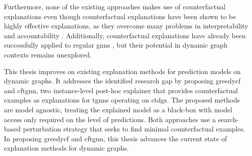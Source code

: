 Furthermore, none of the existing approaches makes use of counterfactual explanations even though counterfactual explanations have been shown to be highly effective explanations, as they overcome many problems in interpretability and accountability \cite{wachter_counterfactual_2018}. Additionally, counterfactual explanations have already been successfully applied to regular \glspl{gnn} \cite{tan_learning_2022, lucic_cf-gnnexplainer_2022}, but their potential in dynamic graph contexts remains unexplored.

This thesis improves on existing explanation methods for prediction models on dynamic graphs. It addresses the identified research gap by proposing \gls{greedycf} and \gls{cftgnn}, two instance-level post-hoc explainer that provides counterfactual examples as explanations for \glspl{tgnn} operating on \glspl{ctdg}. The proposed methods are model agnostic, treating the explained model as a black-box with model access only required on the level of predictions. Both approaches use a search-based perturbation strategy that seeks to find minimal counterfactual examples. In proposing \gls{greedycf} and \gls{cftgnn}, this thesis advances the current state of explanation methods for dynamic graphs.


